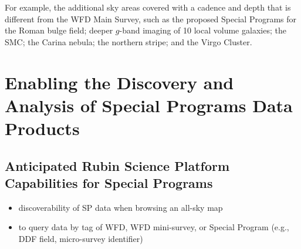 \documentclass[DM,lsstdoc,toc]{lsstdoc}
\begin{document}
For example, the additional sky areas covered with a cadence and depth that is different from the WFD Main Survey, such as the proposed Special Programs for the Roman bulge field; deeper $g$-band imaging of 10 local volume galaxies; the SMC; the Carina nebula; the northern stripe; and the Virgo Cluster.



\clearpage
\section{Enabling the Discovery and Analysis of Special Programs Data Products}\label{sec:analysis}

\subsection{Anticipated Rubin Science Platform Capabilities for Special Programs }

\begin{itemize}
\item discoverability of SP data when browsing an all-sky map
\item to query data by tag of WFD, WFD mini-survey, or Special Program (e.g., DDF field, micro-survey identifier)
\end{itemize}




\clearpage



\clearpage
\appendix










\end{document}
